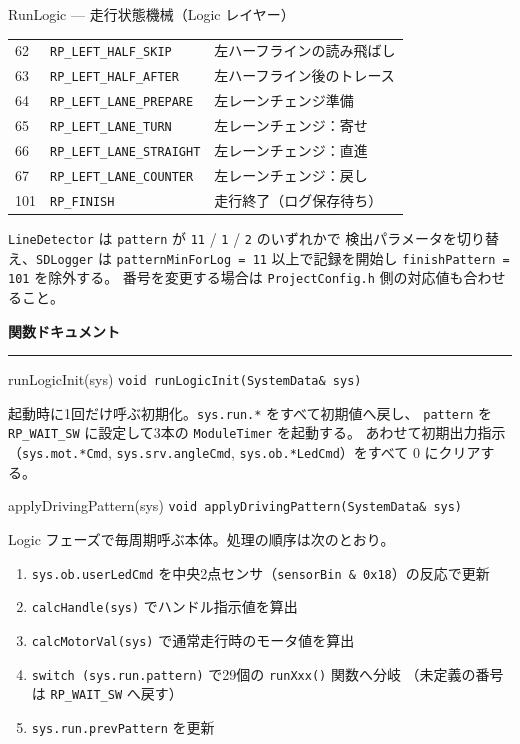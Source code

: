 \documentclass[a4paper,11pt,dvipdfmx]{jsarticle}
\makeatletter
\newcommand{\apisection}[1]{%
  \par\addvspace{4mm}%
  {\normalsize\bfseries\color{headerblue} #1}%
  \par\vspace{-1mm}%
  {\color{accentblue!40}\rule{\linewidth}{0.5pt}}%
  \par\nobreak\vspace{2mm}%
  \@afterheading
}
\makeatother
\begin{document}
\begin{apibox}{RunLogic --- 走行状態機械（Logic レイヤー）}
\begin{longtable}{l l l}
62  & \texttt{RP\_LEFT\_HALF\_SKIP}     & 左ハーフラインの読み飛ばし \\
63  & \texttt{RP\_LEFT\_HALF\_AFTER}    & 左ハーフライン後のトレース \\
64  & \texttt{RP\_LEFT\_LANE\_PREPARE}  & 左レーンチェンジ準備 \\
65  & \texttt{RP\_LEFT\_LANE\_TURN}     & 左レーンチェンジ：寄せ \\
66  & \texttt{RP\_LEFT\_LANE\_STRAIGHT} & 左レーンチェンジ：直進 \\
67  & \texttt{RP\_LEFT\_LANE\_COUNTER}  & 左レーンチェンジ：戻し \\
101 & \texttt{RP\_FINISH}               & 走行終了（ログ保存待ち） \\
\bottomrule
\end{longtable}

\begin{notebox}[パターン番号は他モジュールからも参照される]
\texttt{LineDetector} は \texttt{pattern} が
\texttt{11} / \texttt{1} / \texttt{2} のいずれかで
検出パラメータを切り替え、\texttt{SDLogger} は
\texttt{patternMinForLog = 11} 以上で記録を開始し \texttt{finishPattern = 101} を除外する。
番号を変更する場合は \texttt{ProjectConfig.h} 側の対応値も合わせること。
\end{notebox}

\apisection{関数ドキュメント}

\begin{funcblock}{runLogicInit(sys)}
\texttt{void runLogicInit(SystemData\& sys)}

\vspace{1.5mm}
起動時に1回だけ呼ぶ初期化。\texttt{sys.run.*} をすべて初期値へ戻し、
\texttt{pattern} を \texttt{RP\_WAIT\_SW} に設定して3本の \texttt{ModuleTimer} を起動する。
あわせて初期出力指示（\texttt{sys.mot.*Cmd}, \texttt{sys.srv.angleCmd},
\texttt{sys.ob.*LedCmd}）をすべて 0 にクリアする。
\end{funcblock}

\begin{funcblock}{applyDrivingPattern(sys)}
\texttt{void applyDrivingPattern(SystemData\& sys)}

\vspace{1.5mm}
Logic フェーズで毎周期呼ぶ本体。処理の順序は次のとおり。

\begin{enumerate}[nosep, leftmargin=*]
  \item \texttt{sys.ob.userLedCmd} を中央2点センサ（\texttt{sensorBin \& 0x18}）の反応で更新
  \item \texttt{calcHandle(sys)} でハンドル指示値を算出
  \item \texttt{calcMotorVal(sys)} で通常走行時のモータ値を算出
  \item \texttt{switch (sys.run.pattern)} で29個の \texttt{runXxx()} 関数へ分岐
        （未定義の番号は \texttt{RP\_WAIT\_SW} へ戻す）
  \item \texttt{sys.run.prevPattern} を更新
\end{enumerate}
\end{funcblock}


\end{apibox}
\end{document}
